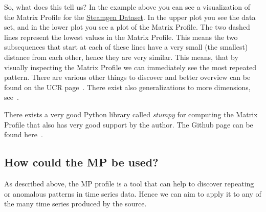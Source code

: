 \documentclass[12pt,a4paper]{article}
\begin{document}
So, what does this tell us? In the example above you can see a visualization of the Matrix Profile for the \href{https://www.cs.ucr.edu/~eamonn/iSAX/steamgen.dat}{Steamgen Dataset}. In the upper plot you see the data set, and in the lower plot
you see a plot of the Matrix Profile. The two dashed lines represent the lowest values in the Matrix Profile. This means the two subsequences that start at each of these lines have a very small (the smallest) distance from each other, hence they are very similar. This means, that by visually inspecting the Matrix Profile we can immediately see the most repeated pattern. There are various other things to discover and better overview can be found on the UCR page~\cite{Keogh:UCRMatrixProfile}. There exist also generalizations to more dimensions, see~\cite{Yeh:MatrixProfileVI}.

There exists a very good Python library called \emph{stumpy} for computing the Matrix Profile that also has very good support by the
author. The Github page can be found here~\cite{Law:stumpy}.

\hypertarget{how-could-the-mp-be-used}{%
\subsection{How could the MP be used?}\label{how-could-the-mp-be-used}}

As described above, the MP profile is a tool that can help to discover repeating or anomalous patterns in time series data. Hence we can aim to apply it to any of the many time series produced by the source.
\end{document}
